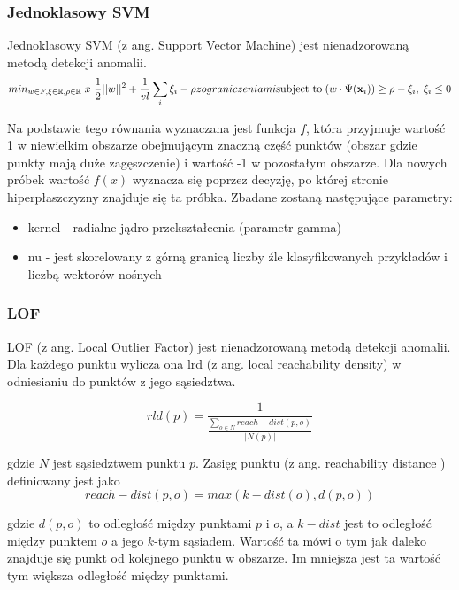 \documentclass{article}
\begin{document}
\subsubsection{Jednoklasowy SVM}

Jednoklasowy SVM (z ang. Support Vector Machine) jest nienadzorowaną metodą detekcji anomalii. 
\begin{equation}
    min_{w \in F, \bf{\xi} \in \mathbb{R}, \rho \in \mathbb{R}}\; x\ \frac{1}{2}||w||^{2} + \frac{1}{vl}\sum_{i} \xi_{i} - \rho 
    z ograniczeniami \text{subject to}\; (w\cdot\Psi(\textbf{x}_{i})) \geq \rho - \xi_{i}, \; \xi_{i} \leq 0
\end{equation}


Na podstawie tego równania wyznaczana jest funkcja $f$, która przyjmuje wartość 1 w niewielkim obszarze obejmującym znaczną część punktów (obszar gdzie punkty mają duże zagęszczenie) i wartość -1 w pozostałym obszarze. 
Dla nowych próbek wartość $f(x)$ wyznacza się poprzez decyzję, po której stronie hiperpłaszczyzny znajduje się ta próbka. 
Zbadane zostaną następujące parametry:
\begin{itemize}
    \item kernel - radialne jądro przekształcenia (parametr gamma)
    \item nu - jest skorelowany z górną granicą liczby źle klasyfikowanych przykładów i liczbą wektorów nośnych

\end{itemize}

\subsubsection{LOF}

LOF (z ang. Local Outlier Factor) jest nienadzorowaną metodą detekcji anomalii. Dla każdego punktu wylicza ona lrd (z ang. local reachability density) w odniesianiu do punktów z jego sąsiedztwa.

\begin{equation}
    rld(p) = \frac{1}{\frac{\sum_{o \in N} reach-dist(p,o)}{|N(p)|}}
\end{equation}

gdzie $N$ jest sąsiedztwem punktu $p$. Zasięg punktu (z ang. reachability distance ) definiowany jest jako 
\begin{equation}
    reach-dist(p,o) = max(k-dist(o), d(p,o))
\end{equation}

gdzie $d(p, o)$ to odległość między punktami $p$ i $o$, a $k-dist$ jest to odległość między punktem $o$ a jego $k$-tym sąsiadem. Wartość ta mówi o tym jak daleko znajduje się punkt od kolejnego punktu w obszarze. Im mniejsza jest ta wartość tym większa odległość między punktami. 
\end{document}
